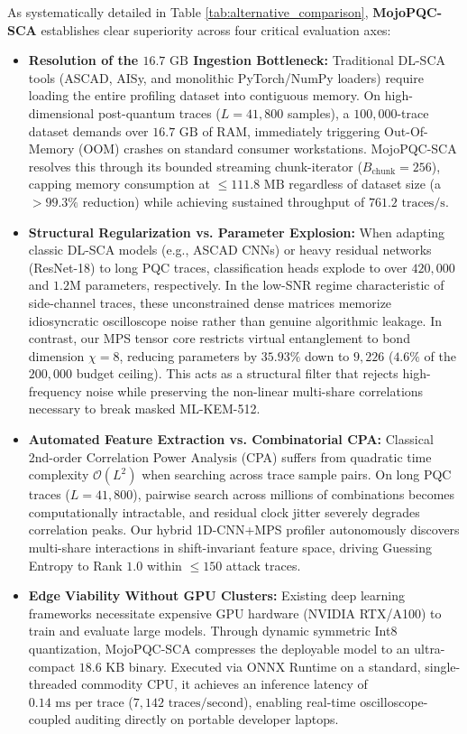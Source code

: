 \documentclass[letterpaper]{article}
\begin{document}
As systematically detailed in Table \ref{tab:alternative_comparison}, \textbf{MojoPQC-SCA} establishes clear superiority across four critical evaluation axes:
\begin{itemize}
    \item \textbf{Resolution of the $16.7\text{ GB}$ Ingestion Bottleneck:} Traditional DL-SCA tools (ASCAD, AISy, and monolithic PyTorch/NumPy loaders) require loading the entire profiling dataset into contiguous memory. On high-dimensional post-quantum traces ($L = 41,800$ samples), a $100,000$-trace dataset demands over $16.7\text{ GB}$ of RAM, immediately triggering Out-Of-Memory (OOM) crashes on standard consumer workstations. MojoPQC-SCA resolves this through its bounded streaming chunk-iterator ($B_{\text{chunk}}=256$), capping memory consumption at $\le 111.8\text{ MB}$ regardless of dataset size (a $>99.3\%$ reduction) while achieving sustained throughput of $761.2\text{ traces/s}$.
    \item \textbf{Structural Regularization vs. Parameter Explosion:} When adapting classic DL-SCA models (e.g., ASCAD CNNs) or heavy residual networks (ResNet-18) to long PQC traces, classification heads explode to over $420,000$ and $1.2\text{M}$ parameters, respectively. In the low-SNR regime characteristic of side-channel traces, these unconstrained dense matrices memorize idiosyncratic oscilloscope noise rather than genuine algorithmic leakage. In contrast, our MPS tensor core restricts virtual entanglement to bond dimension $\chi = 8$, reducing parameters by $35.93\%$ down to $9,226$ ($4.6\%$ of the $200,000$ budget ceiling). This acts as a structural filter that rejects high-frequency noise while preserving the non-linear multi-share correlations necessary to break masked ML-KEM-512.
    \item \textbf{Automated Feature Extraction vs. Combinatorial CPA:} Classical 2nd-order Correlation Power Analysis (CPA) suffers from quadratic time complexity $\mathcal{O}(L^2)$ when searching across trace sample pairs. On long PQC traces ($L=41,800$), pairwise search across millions of combinations becomes computationally intractable, and residual clock jitter severely degrades correlation peaks. Our hybrid 1D-CNN+MPS profiler autonomously discovers multi-share interactions in shift-invariant feature space, driving Guessing Entropy to Rank $1.0$ within $\le 150$ attack traces.
    \item \textbf{Edge Viability Without GPU Clusters:} Existing deep learning frameworks necessitate expensive GPU hardware (NVIDIA RTX/A100) to train and evaluate large models. Through dynamic symmetric Int8 quantization, MojoPQC-SCA compresses the deployable model to an ultra-compact $18.6\text{ KB}$ binary. Executed via ONNX Runtime on a standard, single-threaded commodity CPU, it achieves an inference latency of $0.14\text{ ms per trace}$ ($7,142\text{ traces/second}$), enabling real-time oscilloscope-coupled auditing directly on portable developer laptops.
\end{itemize}
\end{document}
